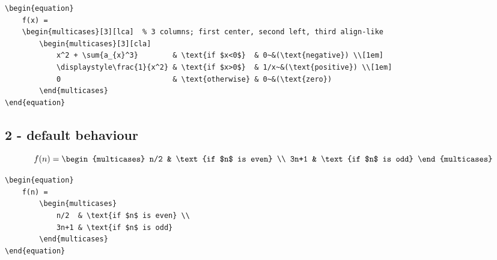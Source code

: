 \documentclass{article}
\begin{document}
\begin{verbatim}
\begin{equation}
    f(x) = 
    \begin{multicases}[3][lca]  % 3 columns; first center, second left, third align-like
        \begin{multicases}[3][cla]
            x^2 + \sum{a_{x}^3}        & \text{if $x<0$}  & 0~&(\text{negative}) \\[1em]
            \displaystyle\frac{1}{x^2} & \text{if $x>0$}  & 1/x~&(\text{positive}) \\[1em]
            0                          & \text{otherwise} & 0~&(\text{zero})
        \end{multicases}
\end{equation}
\end{verbatim}

\subsection*{2 - default behaviour}
\begin{equation}
    f(n) = 
        \begin{multicases}
            n/2  & \text{if $n$ is even} \\
            3n+1 & \text{if $n$ is odd}
        \end{multicases}
\end{equation}

\begin{verbatim}
\begin{equation}
    f(n) = 
        \begin{multicases}
            n/2  & \text{if $n$ is even} \\
            3n+1 & \text{if $n$ is odd}
        \end{multicases}
\end{equation}
\end{verbatim}
\end{document}
